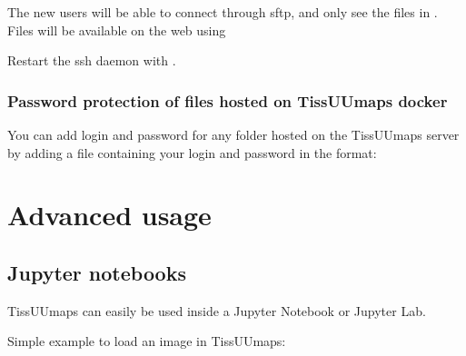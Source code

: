\documentclass[letterpaper,10pt,english,openany,oneside]{sphinxmanual}
\begin{document}
\sphinxAtStartPar
The new users will be able to connect through sftp, and only see the files in . Files will be available on the web using 

\sphinxAtStartPar
Restart the ssh daemon with .


\subsection{Password protection of files hosted on TissUUmaps docker}
\label{\detokenize{docs/sharing/docker:password-protection-of-files-hosted-on-tissuumaps-docker}}
\sphinxAtStartPar
You can add login and password for any folder hosted on the TissUUmaps server by adding a  file containing your login and password in the format:

\begin{sphinxVerbatim}[commandchars=\\\{\}]
\end{sphinxVerbatim}

\sphinxstepscope


\chapter{Advanced usage}
\label{\detokenize{docs/advanced/index:advanced-usage}}\label{\detokenize{docs/advanced/index::doc}}
\sphinxstepscope


\section{Jupyter notebooks}
\label{\detokenize{docs/advanced/jupyter:jupyter-notebooks}}\label{\detokenize{docs/advanced/jupyter::doc}}
\sphinxAtStartPar
TissUUmaps can easily be used inside a Jupyter Notebook or Jupyter Lab.

\sphinxAtStartPar
Simple example to load an image in TissUUmaps:

\begin{sphinxVerbatim}[commandchars=\\\{\}]
  \PYG{p}{[}\PYG{p}{]}

\end{sphinxVerbatim}
\end{document}
